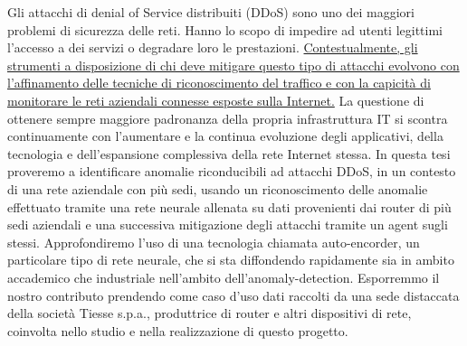 


\italiano
\sommario

Gli attacchi di denial of Service distribuiti (DDoS) sono uno dei maggiori problemi di sicurezza delle reti. Hanno lo scopo di impedire ad utenti legittimi l'accesso a dei servizi o degradare loro le prestazioni. \uline{Contestualmente, gli strumenti a disposizione di chi deve mitigare questo tipo di attacchi evolvono con l'affinamento delle tecniche di riconoscimento del traffico e con la capicità di monitorare le reti aziendali connesse esposte sulla Internet.} La questione di ottenere sempre maggiore padronanza della propria infrastruttura IT si scontra continuamente con l'aumentare e la continua evoluzione degli applicativi, della tecnologia e dell'espansione complessiva della rete Internet stessa. In questa tesi proveremo a identificare anomalie riconducibili ad attacchi DDoS, in un contesto di una rete aziendale con più sedi, usando un riconoscimento delle anomalie effettuato tramite  una rete neurale allenata su dati provenienti dai router di più sedi aziendali e una successiva mitigazione degli attacchi tramite un agent sugli stessi. Approfondiremo l'uso di una tecnologia chiamata auto-encorder, un particolare tipo di rete neurale, che si sta diffondendo rapidamente sia in ambito accademico che industriale nell'ambito dell'anomaly-detection. Esporremmo il nostro contributo prendendo come caso d'uso dati raccolti da una sede distaccata della società Tiesse s.p.a., produttrice di router e altri dispositivi di rete, coinvolta nello studio e nella realizzazione di questo progetto.
